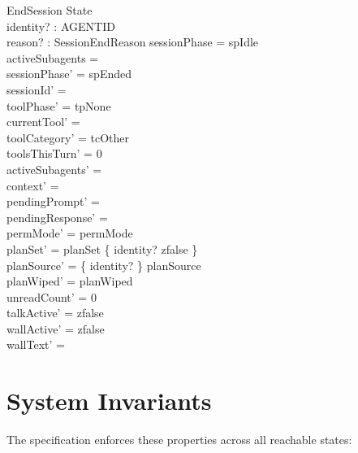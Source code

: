 \documentclass[a4paper,10pt,fleqn]{article}
\begin{document}
\begin{schema}{EndSession}
  \Delta State \\
  identity? : AGENTID \\
  reason? : SessionEndReason
  \where
  sessionPhase = spIdle \\
  activeSubagents = \emptyset \\
  sessionPhase' = spEnded \\
  sessionId' = \emptyset \\
  toolPhase' = tpNone \\
  currentTool' = \emptyset \\
  toolCategory' = tcOther \\
  toolsThisTurn' = 0 \\
  activeSubagents' = \emptyset \\
  context' = \langle \rangle \\
  pendingPrompt' = \emptyset \\
  pendingResponse' = \emptyset \\
  permMode' = permMode \\
  planSet' = planSet \oplus \{ identity? \mapsto zfalse \} \\
  planSource' = \{ identity? \} \ndres planSource \\
  planWiped' = planWiped \\
  unreadCount' = 0 \\
  talkActive' = zfalse \\
  wallActive' = zfalse \\
  wallText' = \emptyset
\end{schema}

\section{System Invariants}

The specification enforces these properties across all reachable states:
\end{document}
